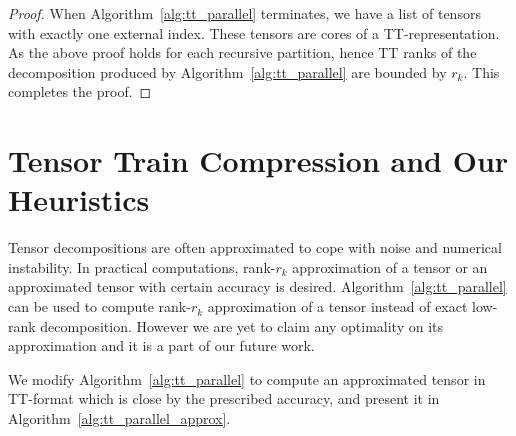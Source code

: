 \documentclass[runningheads]{llncs}
\begin{document}
\begin{proof}
	When Algorithm~\ref{alg:tt_parallel} terminates, we have a list of tensors with exactly one external index. These tensors are cores of a TT-representation. As the above proof holds for each recursive partition, hence TT ranks of the decomposition produced by Algorithm~\ref{alg:tt_parallel} are bounded by $r_k$. This completes the proof.
\end{proof}


\section{Tensor Train Compression and Our Heuristics}
\label{sec:heuristics}


Tensor decompositions are often approximated to cope with noise and numerical instability. In practical computations, rank-$r_k$ approximation of a tensor or an approximated tensor with certain accuracy  is desired. Algorithm~\ref{alg:tt_parallel} can be used to compute rank-$r_k$ approximation of a tensor instead of exact low-rank decomposition. However we are yet to claim any optimality on its approximation and it is a part of our future work.

We modify Algorithm~\ref{alg:tt_parallel} to compute an approximated tensor in TT-format which is close by the prescribed accuracy, and present it in Algorithm~\ref{alg:tt_parallel_approx}.
 
\end{document}
